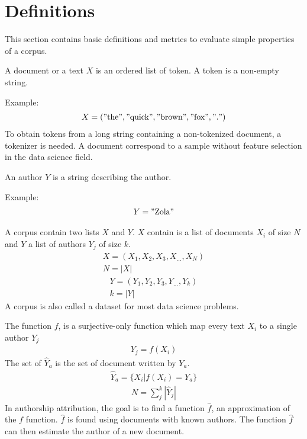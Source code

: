 \section{Definitions \label{sec:definitions}}

This section contains basic definitions and metrics to evaluate simple properties of a corpus.

\begin{definition}
  A document or a text $X$ is an ordered list of token.
  A token is a non-empty string.

  Example:
  \begin{gather*}
    X = ("\text{the}", "\text{quick}", "\text{brown}", "\text{fox}", "\text{.}")
  \end{gather*}
  To obtain tokens from a long string containing a non-tokenized document, a tokenizer is needed.
  A document correspond to a sample without feature selection in the data science field.
\end{definition}

\begin{definition}[Author]
  An author $Y$ is a string describing the author.

  Example:
  \begin{gather*}
    Y = "\text{Zola}"
  \end{gather*}
\end{definition}

\begin{definition}[Corpus]
  A corpus contain two lists $X$ and $Y$.
  $X$ contain is a list of documents $X_i$ of size $N$ and $Y$ a list of authors $Y_j$ of size $k$.
  \begin{gather*}
    X = (X_1, X_2, X_3, X_{...}, X_N) \\
    N = |X|
  \end{gather*}
  \begin{gather*}
    Y = (Y_1, Y_2, Y_3, Y_{...}, Y_k) \\
    k = |Y|
  \end{gather*}
  A corpus is also called a dataset for most data science problems.
\end{definition}

\begin{definition}
  The function $f$, is a surjective-only function which map every text $X_i$ to a single author $Y_j$
  \begin{gather*}
    Y_j = f(X_i)
  \end{gather*}
  The set of $\hat{Y}_a$ is the set of document written by $Y_a$.
  \begin{gather*}
    \hat{Y}_a = \{X_i | f(X_i) = Y_a\}
  \end{gather*}
  \begin{gather*}
    N = \sum_{j}^k |\hat{Y}_j|
  \end{gather*}
  In authorship attribution, the goal is to find a function $\hat{f}$, an approximation of the $f$ function.
  $\hat{f}$ is found using documents with known authors.
  The function $\hat{f}$ can then estimate the author of a new document.
\end{definition}

